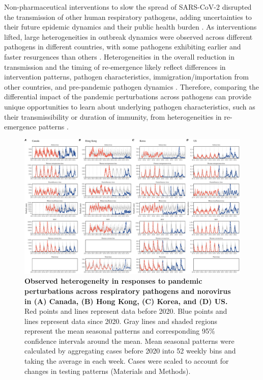 \documentclass[12pt]{article}
\begin{document}
Non-pharmaceutical interventions to slow the spread of SARS-CoV-2 disrupted the transmission of other human respiratory pathogens, adding uncertainties to their future epidemic dynamics and their public health burden \citep{baker2020impact}.
As interventions lifted, large heterogeneities in outbreak dynamics were observed across different pathogens in different countries, with some pathogens exhibiting earlier and faster resurgences than others \citep{gomez2021uncertain,koltai2022determinants,park2024predicting}.
Heterogeneities in the overall reduction in transmission and the timing of re-emergence likely reflect differences in intervention patterns, pathogen characteristics, immigration/importation from other countries, and pre-pandemic pathogen dynamics \citep{perofsky2024impacts}.
Therefore, comparing the differential impact of the pandemic perturbations across pathogens can provide unique opportunities to learn about underlying pathogen characteristics, such as their transmissibility or duration of immunity, from heterogeneities in re-emergence patterns \citep{chow2023effects}.

\begin{figure}[!th]
\includegraphics[width=\textwidth]{../figure1/figure1.pdf}
\caption{
\textbf{Observed heterogeneity in responses to pandemic perturbations across respiratory pathogens and norovirus in (A) Canada, (B) Hong Kong, (C) Korea, and (D) US.}
Red points and lines represent data before 2020.
Blue points and lines represent data since 2020.
Gray lines and shaded regions represent the mean seasonal patterns and corresponding 95\% confidence intervals around the mean.
Mean seasonal patterns were calculated by aggregating cases before 2020 into 52 weekly bins and taking the average in each week.
Cases were scaled to account for changes in testing patterns (Materials and Methods).
}
\end{figure} 
\end{document}
